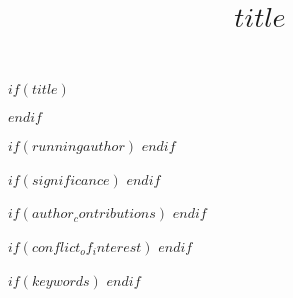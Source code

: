 
$if(title)$
\title{$title$}
$endif$



$if(runningauthor)$
$endif$

$if(significance)$
$endif$

$if(author_contributions)$
$endif$

$if(conflict_of_interest)$
$endif$



$if(keywords)$
$endif$
